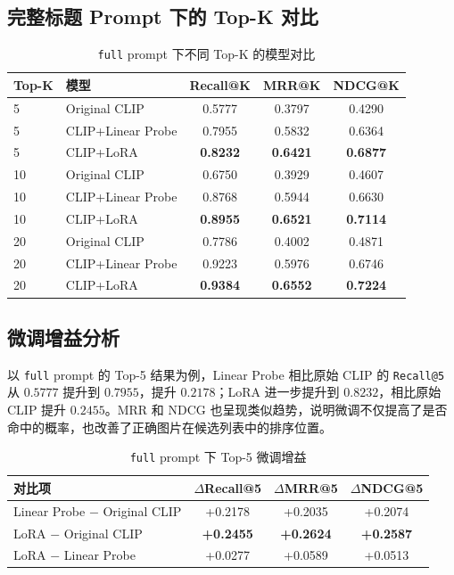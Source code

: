 \documentclass[11pt, a4paper]{ctexart}
\begin{document}
\subsection{完整标题 Prompt 下的 Top-K 对比}

\begin{table}[!htbp]
    \centering
    \caption{\texttt{full} prompt 下不同 Top-K 的模型对比}
    \label{tab:full-topk}
    \small
    \begin{tabular}{llccc}
        \toprule
        \textbf{Top-K} & \textbf{模型} & \textbf{Recall@K} & \textbf{MRR@K} & \textbf{NDCG@K} \\
        \midrule
        5 & Original CLIP & 0.5777 & 0.3797 & 0.4290 \\
        5 & CLIP+Linear Probe & 0.7955 & 0.5832 & 0.6364 \\
        5 & CLIP+LoRA & \textbf{0.8232} & \textbf{0.6421} & \textbf{0.6877} \\
        \midrule
        10 & Original CLIP & 0.6750 & 0.3929 & 0.4607 \\
        10 & CLIP+Linear Probe & 0.8768 & 0.5944 & 0.6630 \\
        10 & CLIP+LoRA & \textbf{0.8955} & \textbf{0.6521} & \textbf{0.7114} \\
        \midrule
        20 & Original CLIP & 0.7786 & 0.4002 & 0.4871 \\
        20 & CLIP+Linear Probe & 0.9223 & 0.5976 & 0.6746 \\
        20 & CLIP+LoRA & \textbf{0.9384} & \textbf{0.6552} & \textbf{0.7224} \\
        \bottomrule
    \end{tabular}
\end{table}
\FloatBarrier

\subsection{微调增益分析}

以 \texttt{full} prompt 的 Top-5 结果为例，Linear Probe 相比原始 CLIP 的 \texttt{Recall@5} 从 $0.5777$ 提升到 $0.7955$，提升 $0.2178$；LoRA 进一步提升到 $0.8232$，相比原始 CLIP 提升 $0.2455$。MRR 和 NDCG 也呈现类似趋势，说明微调不仅提高了是否命中的概率，也改善了正确图片在候选列表中的排序位置。

\begin{table}[!htbp]
    \centering
    \caption{\texttt{full} prompt 下 Top-5 微调增益}
    \label{tab:delta}
    \small
    \begin{tabular}{lccc}
        \toprule
        \textbf{对比项} & \textbf{$\Delta$Recall@5} & \textbf{$\Delta$MRR@5} & \textbf{$\Delta$NDCG@5} \\
        \midrule
        Linear Probe $-$ Original CLIP & +0.2178 & +0.2035 & +0.2074 \\
        LoRA $-$ Original CLIP & \textbf{+0.2455} & \textbf{+0.2624} & \textbf{+0.2587} \\
        LoRA $-$ Linear Probe & +0.0277 & +0.0589 & +0.0513 \\
        \bottomrule
    \end{tabular}
\end{table}
\FloatBarrier
\end{document}
